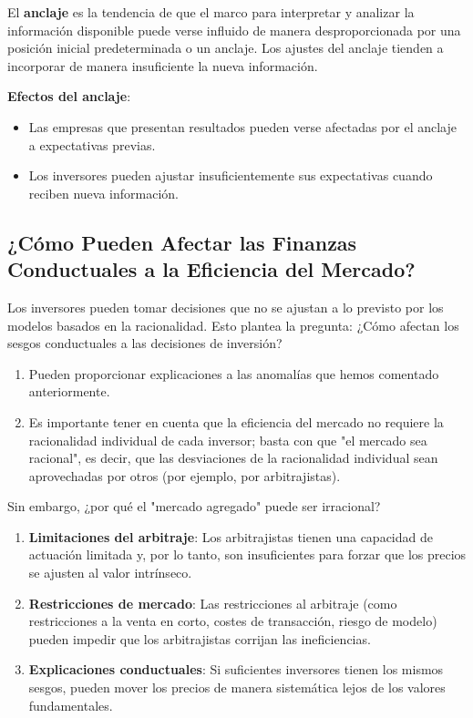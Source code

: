\begin{definicion}[Anclaje]
El \textbf{anclaje} es la tendencia de que el marco para interpretar y analizar la información disponible puede verse influido de manera desproporcionada por una posición inicial predeterminada o un anclaje. Los ajustes del anclaje tienden a incorporar de manera insuficiente la nueva información.
\end{definicion}

\textbf{Efectos del anclaje}:
\begin{itemize}
\item Las empresas que presentan resultados pueden verse afectadas por el anclaje a expectativas previas.
\item Los inversores pueden ajustar insuficientemente sus expectativas cuando reciben nueva información.
\end{itemize}

\subsection{¿Cómo Pueden Afectar las Finanzas Conductuales a la Eficiencia del Mercado?}

Los inversores pueden tomar decisiones que no se ajustan a lo previsto por los modelos basados en la racionalidad. Esto plantea la pregunta: ¿Cómo afectan los sesgos conductuales a las decisiones de inversión?

\begin{enumerate}
\item Pueden proporcionar explicaciones a las anomalías que hemos comentado anteriormente.

\item Es importante tener en cuenta que la eficiencia del mercado no requiere la racionalidad individual de cada inversor; basta con que "el mercado sea racional", es decir, que las desviaciones de la racionalidad individual sean aprovechadas por otros (por ejemplo, por arbitrajistas).
\end{enumerate}

Sin embargo, ¿por qué el "mercado agregado" puede ser irracional?

\begin{enumerate}
\item \textbf{Limitaciones del arbitraje}: Los arbitrajistas tienen una capacidad de actuación limitada y, por lo tanto, son insuficientes para forzar que los precios se ajusten al valor intrínseco.

\item \textbf{Restricciones de mercado}: Las restricciones al arbitraje (como restricciones a la venta en corto, costes de transacción, riesgo de modelo) pueden impedir que los arbitrajistas corrijan las ineficiencias.

\item \textbf{Explicaciones conductuales}: Si suficientes inversores tienen los mismos sesgos, pueden mover los precios de manera sistemática lejos de los valores fundamentales.
\end{enumerate}

